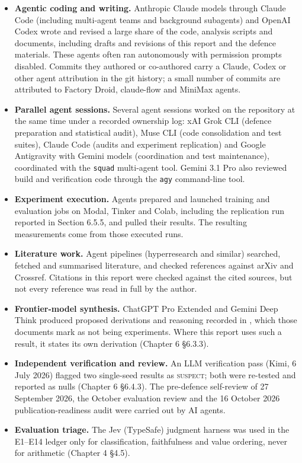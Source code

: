 \documentclass[12pt,a4paper]{report}
\DeclareRobustCommand{\longtok}[1]{\texttt{\seqsplit{#1}}}
\begin{document}
\begin{itemize}
\item \textbf{Agentic coding and writing.} Anthropic Claude models through
Claude Code (including multi-agent teams and background subagents) and OpenAI
Codex wrote and revised a large share of the code, analysis scripts and documents,
including drafts and revisions of this report and the defence materials. These
agents often ran autonomously with permission prompts disabled. Commits they
authored or co-authored carry a Claude, Codex or other agent attribution in
the git history; a small number of commits are attributed to Factory Droid,
claude-flow and MiniMax agents.
\item \textbf{Parallel agent sessions.} Several agent sessions worked on the
repository at the same time under a recorded ownership log: xAI Grok CLI
(defence preparation and statistical audit), Muse CLI (code consolidation and
test suites), Claude Code (audits and experiment replication) and Google
Antigravity with Gemini models (coordination and test maintenance), coordinated
with the \texttt{squad} multi-agent tool. Gemini 3.1 Pro also reviewed build
and verification code through the \texttt{agy} command-line tool.
\item \textbf{Experiment execution.} Agents prepared and launched training and
evaluation jobs on Modal, Tinker and Colab, including the replication run
reported in Section 6.5.5, and pulled their results. The resulting
measurements come from those executed runs.
\item \textbf{Literature work.} Agent pipelines (hyperresearch and similar)
searched, fetched and summarised literature, and checked references against
arXiv and Crossref. Citations in this report were checked against the cited
sources, but not every reference was read in full by the author.
\item \textbf{Frontier-model synthesis.} ChatGPT Pro Extended and Gemini Deep
Think produced proposed derivations and reasoning recorded in
\longtok{platform\_hybrid/paper/sections/frontier\_synthesis\_*.tex}, which those
documents mark as not being experiments. Where this report uses such a result,
it states its own derivation (Chapter 6 \S6.3.3).
\item \textbf{Independent verification and review.} An LLM verification pass
(Kimi, 6 July 2026) flagged two single-seed results as \textsc{suspect}; both
were re-tested and reported as nulls (Chapter 6 \S6.4.3). The pre-defence
self-review of 27 September 2026, the October evaluation review and the
16 October 2026 publication-readiness audit were carried out by AI agents.
\item \textbf{Evaluation triage.} The Jev (TypeSafe) judgment harness was used
in the E1--E14 ledger only for classification, faithfulness and value
ordering, never for arithmetic (Chapter 4 \S4.5).
\end{itemize}
\end{document}

